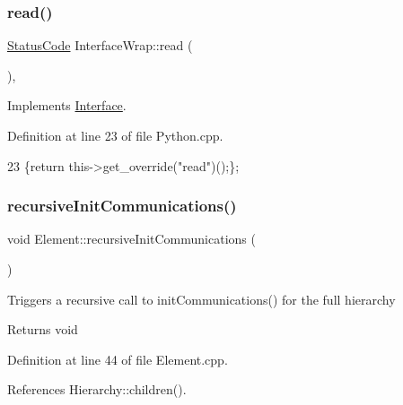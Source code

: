 \subsubsection{\texorpdfstring{read()}{read()}}
{\footnotesize\ttfamily \hyperlink{classStatusCode}{Status\+Code} Interface\+Wrap\+::read (\begin{DoxyParamCaption}\item[{\hyperlink{classIOdata}{I\+Odata} $\ast$}]{ }\end{DoxyParamCaption})\hspace{0.3cm}{\ttfamily [inline]}, {\ttfamily [virtual]}}



Implements \hyperlink{classInterface_a99136b67c8e6cbcaa0477c36940ac2ef}{Interface}.



Definition at line 23 of file Python.\+cpp.


\begin{DoxyCode}
23 \{\textcolor{keywordflow}{return} this->get\_override(\textcolor{stringliteral}{"read"})();\};
\end{DoxyCode}
\mbox{\label{classElement_a82119ed37dff76508a2746a853ec35ba}} 
\subsubsection{\texorpdfstring{recursive\+Init\+Communications()}{recursiveInitCommunications()}}
{\footnotesize\ttfamily void Element\+::recursive\+Init\+Communications (\begin{DoxyParamCaption}{ }\end{DoxyParamCaption})\hspace{0.3cm}{\ttfamily [inherited]}}

Triggers a recursive call to init\+Communications() for the full hierarchy

\begin{DoxyReturn}{Returns}
void 
\end{DoxyReturn}


Definition at line 44 of file Element.\+cpp.



References Hierarchy\+::children().



